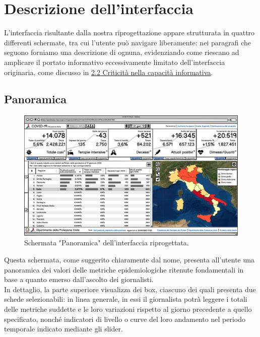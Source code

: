 \documentclass[../../main.tex]{subfiles}
\begin{document}
\clearpage
\section{Descrizione dell'interfaccia}
L'interfaccia risultante dalla nostra riprogettazione appare strutturata in quattro differenti schermate, tra cui l'utente può navigare liberamente: nei paragrafi che seguono forniamo una descrizione di ognuna, evidenziando come riescano ad amplicare il portato informativo eccessivamente limitato dell'interfaccia originaria, come discusso in \hyperref[ss:criticita-informative]{2.2 Criticità nella capacità informativa}.

\subsection{Panoramica}
\begin{figure}[h]
    \centering
    \includegraphics[width = \textwidth]{res/img/1 - Panoramica}
    \caption{Schermata "Panoramica" dell'interfaccia riprogettata.}
    \label{fig:panoramica}
\end{figure}

Questa schermata, come suggerito chiaramente dal nome, presenta all'utente una panoramica dei valori delle metriche epidemiologiche ritenute fondamentali in base a quanto emerso dall'ascolto dei giornalisti.\\
In dettaglio, la parte superiore visualizza dei box, ciascuno dei quali presenta due schede selezionabili: in linea generale, in essi il giornalista potrà leggere i totali delle metriche suddette e le loro variazioni rispetto al giorno precedente a quello specificato, nonché indicatori di livello o curve del loro andamento nel periodo temporale indicato mediante gli slider.\\
\end{document}
